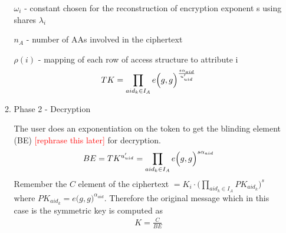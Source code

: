 \begin{enumerate}
\begin{enumerate}
		$\omega_{i}$ - constant chosen for the reconstruction of encryption exponent s using shares $\lambda_{i}$
		
		$n_A$ - number of AAs involved in the ciphertext
		
		$\rho(i)$ - mapping of each row of access structure to attribute i
		\begin{align*}
			TK = \prod\limits_{aid_{k} \in I_{A}} e\Bigl(g, g\Bigl)^{\frac{s\alpha_{aid}}{u'_{uid}}}
		\end{align*}
		\item Phase 2 - Decryption
		
		The user does an exponentiation on the token to get the blinding element (BE) \textcolor{red}{[rephrase this later]} for decryption.
		\begin{align*}
			BE= TK^{u'_{uid}} = \prod\limits_{aid_{k} \in I_{A}} e\Bigl(g, g\Bigl)^{s\alpha_{aid}}
		\end{align*}
		Remember the $C$ element of the ciphertext $= K_i\cdot\bigl(\prod\limits_{aid_{k} \in I_{A}}PK_{aid_{k}}\bigl)^{s}$ where $PK_{aid_{k}} = e\bigl(g, g\bigl)^{\alpha_{aid}}$. Therefore the original message which in this case is the symmetric key is computed as
		\begin{align*}
			K = \frac{C}{BE}
		\end{align*}
	\end{enumerate}
	
\end{enumerate}
